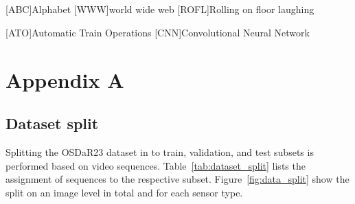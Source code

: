 \documentclass[Master,MDS,english]{BASE/twbook} %
\begin{document}
{}
\chapter*{\listacroname}
\begin{acronym}[XXXXX]
    [ABC]{Alphabet}
    [WWW]{world wide web}
    [ROFL]{Rolling on floor laughing}
    
    
    
    [ATO]{Automatic Train Operations}
    [CNN]{Convolutional Neural Network}
    
\end{acronym}
\clearpage


\appendix
\chapter{Appendix A}

\section{Dataset split} \label{app:data_split}

Splitting the OSDaR23 dataset in to train, validation, and test subsets is performed based on video sequences. Table~\ref{tab:dataset_split} lists the assignment of sequences to the respective subset. Figure~\ref{fig:data_split} show the split on an image level in total and for each sensor type.
\end{document}
